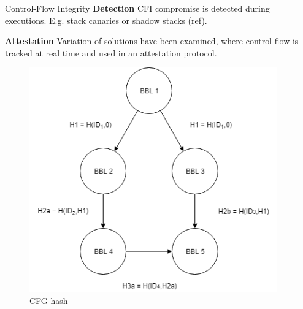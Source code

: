 \documentclass[final]{beamer}
\newlength{\onecolwid}
\newlength{\twocolwid}
\begin{document}
\begin{frame}[t]
\begin{columns}[t]
\begin{column}{\twocolwid}
\begin{columns}[t,totalwidth=\twocolwid]
\begin{column}{\onecolwid}
\begin{block}{Control-Flow Integrity}
\textbf{Detection} CFI compromise is detected during executions. E.g. stack canaries or shadow stacks (ref).

\textbf{Attestation} Variation of solutions have been examined, where control-flow is tracked at real time and used in an attestation protocol.
\end{block}

\begin{figure}
\includegraphics[width=\linewidth]{images/CFGhash.png}
\caption{CFG hash}
\vspace{-1cm}
\end{figure}

\end{column} %


\begin{column}{\onecolwid}\vspace{-.6in} %


\end{column}
\end{columns}
\end{column}
\end{columns}
\end{frame}
\end{document}
